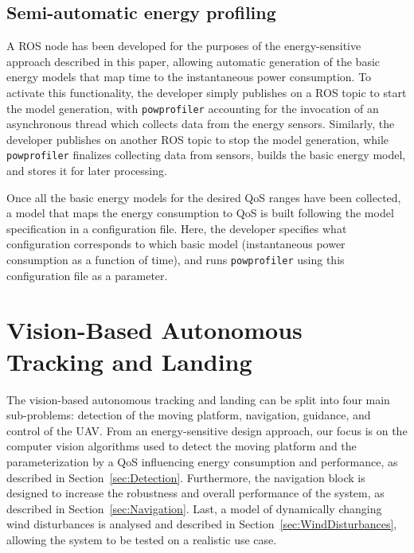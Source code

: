 \documentclass[conference]{IEEEtran}
\newcommand{\stt}[1]{{\small\tt #1}} %
\newcommand{\powprof}{\stt{powprofiler}}
\newcommand{\adam}[2][]{\todo[color=orange!20, #1]{ADAM: #2}}
\begin{document}

\subsection{Semi-automatic energy profiling}


%
A ROS node has been developed for the purposes of the energy-sensitive
approach described in this paper, allowing automatic
generation of the basic energy models that map time to the
instantaneous power consumption. To activate this functionality, the developer simply publishes on a ROS
topic to start the model generation, with \powprof{} accounting for
the invocation of an asynchronous thread which collects data from the
energy sensors. Similarly, the developer publishes on another ROS topic to
stop the model generation, while \powprof{} finalizes collecting data from
sensors, builds the basic energy model, and stores it for later processing.

Once all the basic energy models for the desired QoS ranges have been
collected, a model that maps the energy consumption to QoS
is built following the model specification in a configuration file. Here, the developer specifies
what configuration corresponds to which basic model
(instantaneous power consumption as a function of time), and runs
\powprof{} using this configuration file as a parameter.
%

\section{Vision-Based Autonomous Tracking and Landing}
\label{sec:landing}

The vision-based autonomous tracking and landing can be split into
four main sub-problems: detection of the moving platform, navigation,
guidance, and control of the UAV. From an energy-sensitive design
approach, our focus is on the computer vision algorithms used to
detect the moving platform and the parameterization by a QoS
influencing energy consumption and performance, as described in
Section~\ref{sec:Detection}. Furthermore, the navigation block is
designed to increase the robustness and overall performance of the
system, as described in Section~\ref{sec:Navigation}. Last, a model of
dynamically changing wind disturbances is analysed and described in
Section~\ref{sec:WindDisturbances}, allowing the system to be tested
on a realistic use case.
\end{document}
